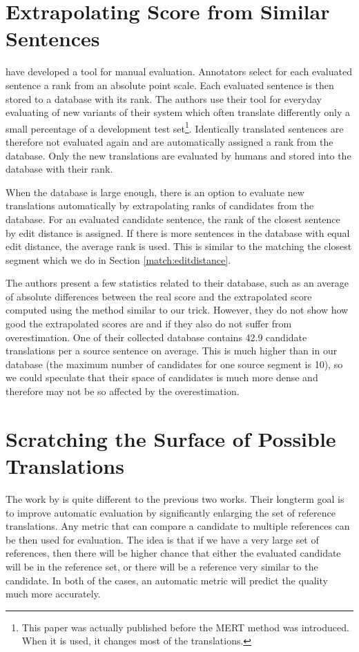 \section{Extrapolating Score from Similar Sentences}

 have developed a tool for manual evaluation.
Annotators select for each evaluated sentence a rank from an absolute point
scale. Each evaluated sentence is then stored to a database with its rank. The
authors use their tool for everyday evaluating of new variants of their system
which often translate differently only a small percentage of a development test
set\footnote{This paper was actually published before the MERT method was
introduced.  When it is used, it changes most of the translations.}.
Identically translated sentences are therefore not evaluated again and are
automatically assigned a rank from the database. Only the new translations are
evaluated by humans and stored into the database with their rank.

When the database is large enough, there is an option to evaluate new
translations automatically by extrapolating ranks of candidates from the
database.  For an evaluated candidate sentence, the rank of the closest
sentence by edit distance is assigned. If there is more sentences in the
database with equal edit distance, the average rank is used. This is similar to
the matching the closest segment which we do in Section
\ref{match:editdistance}.

The authors present a few statistics related to their database, such as an
average of absolute differences between the real score and the extrapolated
score computed using the method similar to our  trick.
However, they do not show how good the extrapolated scores are and if they also
do not suffer from overestimation. One of their collected database contains
42.9 candidate translations per a source sentence on average. This is much
higher than in our database (the maximum number of candidates for one source
segment is 10), so we could speculate that their space of candidates is much
more dense and therefore may not be so affected by the overestimation.

\section{Scratching the Surface of Possible Translations}

The work by  is quite different to the previous
two works. Their longterm goal is to improve automatic evaluation by
significantly enlarging the set of reference translations. Any metric that can
compare a candidate to multiple references can be then used for evaluation. The
idea is that if we have a very large set of references, then there will be higher
chance that either the evaluated candidate will be in the reference set, or
there will be a reference very similar to the candidate. In both of the cases,
an automatic metric will predict the quality much more accurately. 

